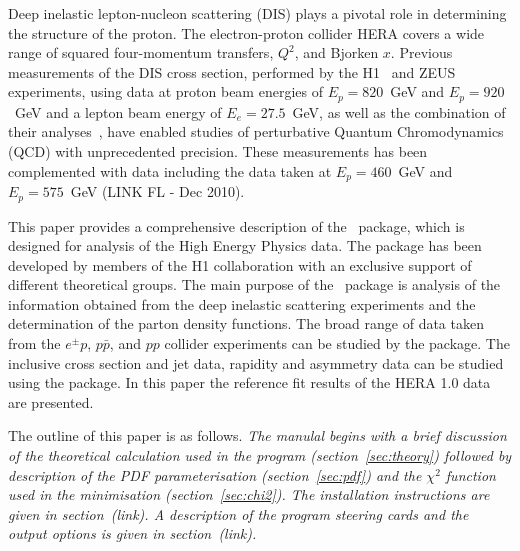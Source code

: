 
\label{sec:intro}
Deep inelastic lepton-nucleon scattering (DIS) plays a pivotal role in
determining the structure of the proton. 
%
The electron-proton collider HERA
covers a wide range of squared four-momentum transfers, $Q^2$, and 
Bjorken $x$.
%
Previous measurements
of the DIS cross section, performed 
by the H1~\cite{H1:2009bp,Aaron:2009kv,h1alphas,Adloff:1999ah,Adloff:2000qj,Adloff:2003uh} 
and ZEUS~\cite{Breitweg:1997hz,Breitweg:2000yn,Breitweg:1998dz,Chekanov:2001qu,zeuscc97,
Chekanov:2002ej,Chekanov:2002zs,Chekanov:2003yv,Chekanov:2003vw}
 experiments, using data at proton beam energies of
$E_p=820$~GeV and $E_p=920$~GeV and a lepton beam energy of 
$E_e=27.5$~GeV,
as well as the combination of their analyses~\cite{h1zeus:2009wt},
have enabled studies of 
perturbative Quantum Chromodynamics (QCD) with unprecedented precision. 
%
These measurements has been complemented with data including the 
data taken at $E_p=460$~GeV and $E_p=575$~GeV (LINK FL - Dec 2010).
%

This paper provides a comprehensive description of the \fitter\ package,
which is designed for analysis of the High Energy Physics data.
The package has been developed by members of the H1 collaboration
with an exclusive support of different theoretical groups.
The main purpose of the \fitter\ package is analysis of the information
obtained from the deep inelastic scattering experiments
and the determination of the parton density functions.
The broad range of data taken from the $e^{\pm}p$, $p\bar{p}$, and $pp$ collider experiments can be
studied by the package. The inclusive cross section and jet data,
rapidity and asymmetry data can be studied using the package.
In this paper the reference fit results of
the HERA 1.0 data~\cite{h1zeus:2009wt} are presented.

The outline of this paper is as follows.
\emph{The manulal begins with a brief discussion of the theoretical calculation
used in the program (section~\ref{sec:theory}) followed by description of the
PDF parameterisation (section~\ref{sec:pdf}) and the $\chi^2$ function used in the
minimisation (section~\ref{sec:chi2}). The installation instructions are given in
section~(link). A description of the program steering cards and
the output options is given in section~(link).}

